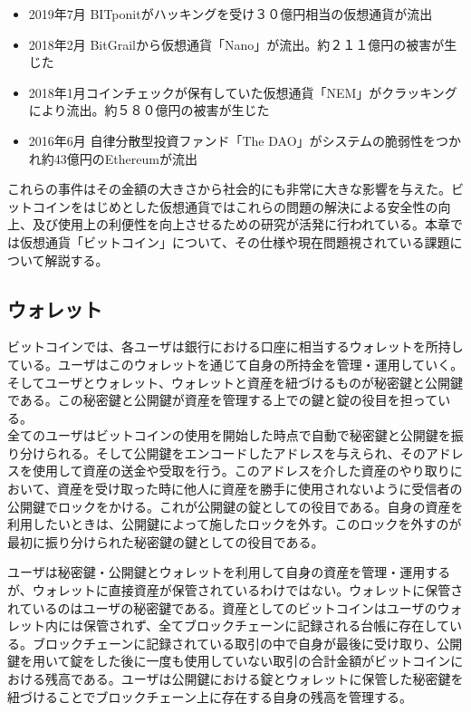 \documentclass[12pt]{jarticle}
\begin{document}
\begin{itemize}
\item 2019年7月 BITponitがハッキングを受け３０億円相当の仮想通貨が流出\cite{jiken1}
\item 2018年2月 BitGrailから仮想通貨「Nano」が流出。約２１１億円の被害が生じた\cite{jiken2}
\item 2018年1月コインチェックが保有していた仮想通貨「NEM」がクラッキングにより流出。約５８０億円の被害が生じた\cite{jiken3}
\item 2016年6月 自律分散型投資ファンド「The DAO」がシステムの脆弱性をつかれ約43億円のEthereumが流出\cite{jiken4}
\end{itemize}

これらの事件はその金額の大きさから社会的にも非常に大きな影響を与えた。ビットコインをはじめとした仮想通貨ではこれらの問題の解決による安全性の向上、及び使用上の利便性を向上させるための研究が活発に行われている。本章では仮想通貨「ビットコイン」について、その仕様や現在問題視されている課題について解説する。

\subsection{ウォレット}
ビットコインでは、各ユーザは銀行における口座に相当するウォレットを所持している。ユーザはこのウォレットを通じて自身の所持金を管理・運用していく。そしてユーザとウォレット、ウォレットと資産を紐づけるものが秘密鍵と公開鍵である。この秘密鍵と公開鍵が資産を管理する上での鍵と錠の役目を担っている。
\\
全てのユーザはビットコインの使用を開始した時点で自動で秘密鍵と公開鍵を振り分けられる。そして公開鍵をエンコードしたアドレスを与えられ、そのアドレスを使用して資産の送金や受取を行う。このアドレスを介した資産のやり取りにおいて、資産を受け取った時に他人に資産を勝手に使用されないように受信者の公開鍵でロックをかける。これが公開鍵の錠としての役目である。自身の資産を利用したいときは、公開鍵によって施したロックを外す。このロックを外すのが最初に振り分けられた秘密鍵の鍵としての役目である。
\par
ユーザは秘密鍵・公開鍵とウォレットを利用して自身の資産を管理・運用するが、ウォレットに直接資産が保管されているわけではない。ウォレットに保管されているのはユーザの秘密鍵である。資産としてのビットコインはユーザのウォレット内には保管されず、全てブロックチェーンに記録される台帳に存在している。ブロックチェーンに記録されている取引の中で自身が最後に受け取り、公開鍵を用いて錠をした後に一度も使用していない取引の合計金額がビットコインにおける残高である。ユーザは公開鍵における錠とウォレットに保管した秘密鍵を紐づけることでブロックチェーン上に存在する自身の残高を管理する。
\end{document}
